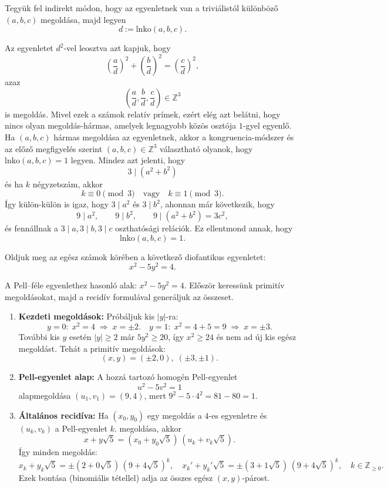 \begin{solution}
Tegyük fel indirekt módon, hogy az egyenletnek van a triviálistól
különböző $(a,b,c)$ megoldása, majd legyen 
\[
d:=\text{lnko}(a,b,c).
\]

Az egyenletet $d^{2}$-vel leosztva azt kapjuk, hogy 
\[
\left(\frac{a}{d}\right)^{2}+\left(\frac{b}{d}\right)^{2}=\left(\frac{c}{d}\right)^{2},
\]
azaz 
\[
\left(\frac{a}{d},\frac{b}{d},\frac{c}{d}\right)\in\mathbb{Z}^{3}
\]
is megoldás. Mivel ezek a számok relatív prímek, ezért elég azt belátni,
hogy nincs olyan megoldás-hármas, amelyek legnagyobb közös osztója
$1$-gyel egyenlő. Ha $(a,b,c)$ hármas megoldása az egyenletnek,
akkor a kongruencia-módszer és az előző megfigyelés szerint $(a,b,c)\in\mathbb{Z}^{3}$
választható olyanok, hogy $\text{lnko}(a,b,c)=1$ legyen. Mindez azt
jelenti, hogy 
\[
3\mid(a^{2}+b^{2})
\]
és ha $k$ négyzetszám, akkor 
\[
k\equiv0\pmod 3\quad\text{vagy}\quad k\equiv1\pmod 3.
\]
Így külön-külön is igaz, hogy $3\mid a^{2}$ és $3\mid b^{2}$, ahonnan
már következik, hogy 
\[
9\mid a^{2},\qquad9\mid b^{2},\qquad9\mid(a^{2}+b^{2})=3c^{2},
\]
és fennállnak a $3\mid a,3\mid b,3\mid c$ oszthatósági relációk.
Ez ellentmond annak, hogy 
\[
\text{lnko}(a,b,c)=1.
\]
\end{solution}
\begin{extraproblem}
Oldjuk meg az egész számok körében a következő diofantikus egyenletet:
\[
x^{2}-5y^{2}=4.
\]
\end{extraproblem}

\vspace{1em}

\begin{solution}
A Pell--féle egyenlethez hasonló alak: $x^{2}-5y^{2}=4$. Először
keressünk primitív megoldásokat, majd a recidív formulával generáljuk
az összeset.
\begin{enumerate}
\item \textbf{Kezdeti megoldások:} Próbáljuk kis $\lvert y\rvert$-ra: 
\[
y=0:\;x^{2}=4\;\Rightarrow\;x=\pm2.\quad y=1:\;x^{2}=4+5=9\;\Rightarrow\;x=\pm3.
\]
További kis $y$ esetén $\lvert y\rvert\ge2$ már $5y^{2}\ge20$,
így $x^{2}\ge24$ és nem ad új kis egész megoldást. Tehát a primitív
megoldások: 
\[
(x,y)=(\pm2,0),\;(\pm3,\pm1).
\]
\item \textbf{Pell-egyenlet alap:} A hozzá tartozó homogén Pell-egyenlet
\[
u^{2}-5v^{2}=1
\]
alapmegoldása $(u_{1},v_{1})=(9,4)$, mert $9^{2}-5\cdot4^{2}=81-80=1$.
\item \textbf{Általános recidíva:} Ha $(x_{0},y_{0})$ egy megoldás a $4$-es
egyenletre és $(u_{k},v_{k})$ a Pell-egyenlet $k$. megoldása, akkor
\[
x+y\sqrt{5}=(x_{0}+y_{0}\sqrt{5})\,(u_{k}+v_{k}\sqrt{5}).
\]
Így minden megoldás: 
\[
x_{k}+y_{k}\sqrt{5}=\pm(2+0\sqrt{5})\,(9+4\sqrt{5})^{k},\quad x_{k}'+y_{k}'\sqrt{5}=\pm(3+1\sqrt{5})\,(9+4\sqrt{5})^{k},\quad k\in\mathbb{Z}_{\ge0}.
\]
Ezek bontása (binomiális tétellel) adja az összes egész $(x,y)$-párost. 
\end{enumerate}
\end{solution}
\vspace{1em}

